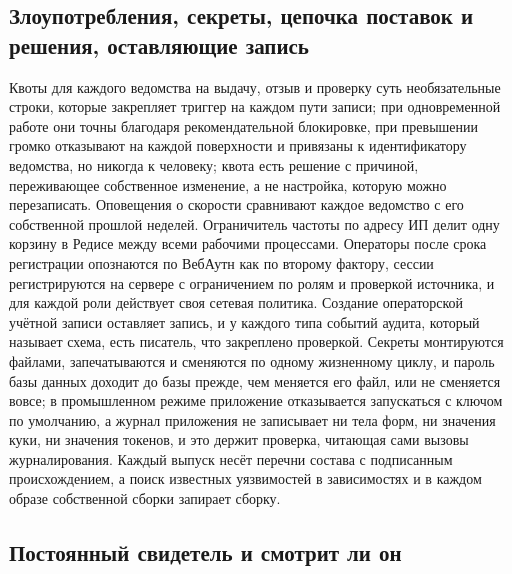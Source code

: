 \subsection{Злоупотребления, секреты, цепочка поставок и решения, оставляющие запись}

Квоты для каждого ведомства на выдачу, отзыв и проверку суть необязательные строки, которые
закрепляет триггер на каждом пути записи; при одновременной работе они точны благодаря
рекомендательной блокировке, при превышении громко отказывают на каждой поверхности и привязаны к
идентификатору ведомства, но никогда к человеку; квота есть решение с
причиной, переживающее собственное изменение, а не настройка, которую можно перезаписать.
Оповещения о скорости сравнивают каждое ведомство с его собственной прошлой неделей. Ограничитель
частоты по адресу ИП делит одну корзину в Редисе между всеми рабочими процессами. Операторы после
срока регистрации опознаются по ВебАутн как по второму фактору, сессии регистрируются на сервере с
ограничением по ролям и проверкой источника, и для каждой роли действует своя сетевая политика.
Создание операторской учётной записи оставляет запись, и у каждого типа событий аудита, который
называет схема, есть писатель, что закреплено проверкой. Секреты монтируются файлами,
запечатываются и сменяются по одному жизненному циклу, и пароль базы данных доходит до базы прежде,
чем меняется его файл, или не сменяется вовсе; в промышленном режиме приложение
отказывается запускаться с ключом по умолчанию, а журнал приложения не записывает ни тела форм,
ни значения куки, ни значения токенов, и это держит проверка, читающая сами вызовы
журналирования. Каждый выпуск несёт
перечни состава с подписанным происхождением, а поиск известных уязвимостей в зависимостях и в
каждом образе собственной сборки запирает сборку. \sImpl

\subsection{Постоянный свидетель и смотрит ли он}

